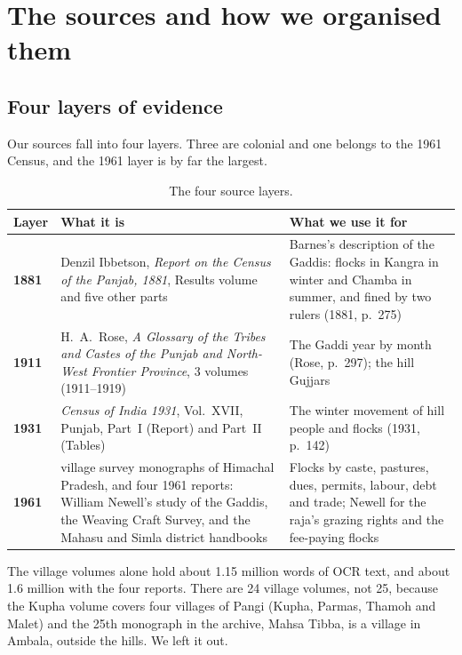 \documentclass[10pt,a4paper,twocolumn]{article}
\newcommand{\pg}[2]{(#1, p.~#2)}
\begin{document}
\section{The sources and how we organised them}\label{sec:sources}

\subsection{Four layers of evidence}

Our sources fall into four layers. Three are colonial and one belongs to the 1961 Census, and the 1961 layer is by far the largest.

\begin{table}[!t]
\centering\small
\begin{tabularx}{\textwidth}{@{}>{\bfseries\color{maroon}}l>{\raggedright\arraybackslash}X>{\raggedright\arraybackslash}X@{}}
\toprule
\textcolor{ink}{Layer} & \textbf{What it is} & \textbf{What we use it for}\\
\midrule
1881 & Denzil Ibbetson, \emph{Report on the Census of the Panjab, 1881}, Results volume and five other parts & Barnes's description of the Gaddis: flocks in Kangra in winter and Chamba in summer, and fined by two rulers \pg{1881}{275}\\
1911 & H.~A.~Rose, \emph{A Glossary of the Tribes and Castes of the Punjab and North-West Frontier Province}, 3 volumes (1911--1919) & The Gaddi year by month \pg{Rose}{297}; the hill Gujjars\\
1931 & \emph{Census of India 1931}, Vol.~XVII, Punjab, Part~I (Report) and Part~II (Tables) & The winter movement of hill people and flocks \pg{1931}{142}\\
1961 & 24 village survey monographs of Himachal Pradesh, and four 1961 reports: William Newell's study of the Gaddis, the Weaving Craft Survey, and the Mahasu and Simla district handbooks & Flocks by caste, pastures, dues, permits, labour, debt and trade; Newell for the raja's grazing rights and the fee-paying flocks\\
\bottomrule
\end{tabularx}
\caption{The four source layers.}
\end{table}

The village volumes alone hold about 1.15 million words of OCR text, and about 1.6 million with the four reports. There are 24 village volumes, not 25, because the Kupha volume covers four villages of Pangi (Kupha, Parmas, Thamoh and Malet) and the 25th monograph in the archive, Mahsa Tibba, is a village in Ambala, outside the hills. We left it out.
\end{document}
